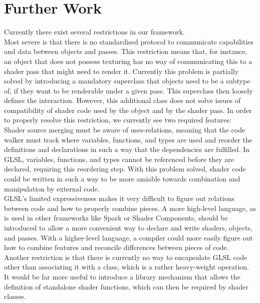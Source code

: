 \documentclass[format=sigconf]{acmart}
\begin{document}
\section{Further Work}\label{further-work}
Currently there exist several restrictions in our framework. \\

Most severe is that there is no standardised protocol to communicate capabilities and data between objects and passes. This restriction means that, for instance, an object that does not possess texturing has no way of communicating this to a shader pass that might need to render it. Currently this problem is partially solved by introducing a mandatory superclass that objects need to be a subtype of, if they want to be renderable under a given pass. This superclass then loosely defines the interaction. However, this additional class does not solve issues of compatibility of shader code used by the object and by the shader pass. In order to properly resolve this restriction, we currently see two required features: \\

Shader source merging must be aware of uses-relations, meaning that the code walker must track where variables, functions, and types are used and reorder the definitions and declarations in such a way that the dependencies are fulfilled. In GLSL, variables, functions, and types cannot be referenced before they are declared, requiring this reordering step. With this problem solved, shader code could be written in such a way to be more amiable towards combination and manipulation by external code. \\

GLSL's limited expressiveness makes it very difficult to figure out relations between code and how to properly combine pieces. A more high-level language, as is used in other frameworks like Spark\cite{spark} or Shader Components\cite{components}, should be introduced to allow a more convenient way to declare and write shaders, objects, and passes. With a higher-level language, a compiler could more easily figure out how to combine features and reconcile differences between pieces of code. \\

Another restriction is that there is currently no way to encapsulate GLSL code other than associating it with a class, which is a rather heavy-weight operation. It would be far more useful to introduce a library mechanism that allows the definition of standalone shader functions, which can then be required by shader classes.
\end{document}
